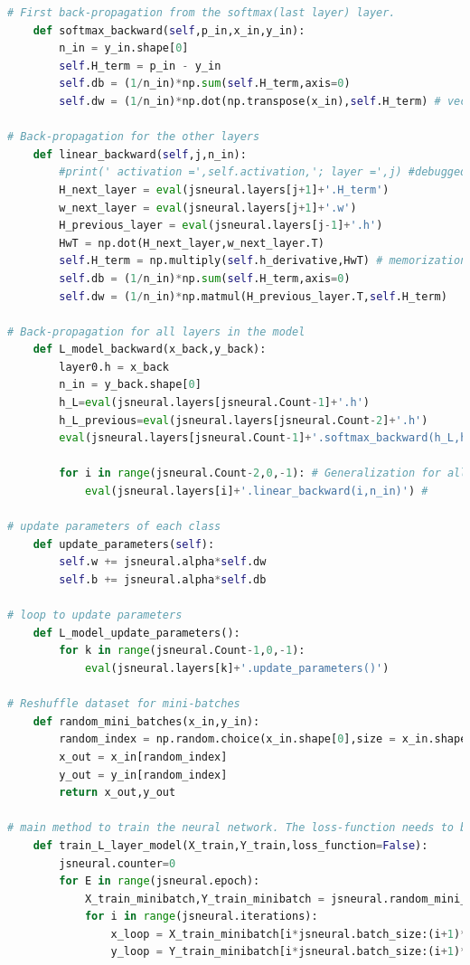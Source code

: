 \documentclass{article}
\begin{document}
\begin{lstlisting}[language=Python]
# First back-propagation from the softmax(last layer) layer.    
    def softmax_backward(self,p_in,x_in,y_in):
        n_in = y_in.shape[0]
        self.H_term = p_in - y_in
        self.db = (1/n_in)*np.sum(self.H_term,axis=0)
        self.dw = (1/n_in)*np.dot(np.transpose(x_in),self.H_term) # vector dJ/dW_j to update w_j for softmax

# Back-propagation for the other layers    
    def linear_backward(self,j,n_in):
        #print(' activation =',self.activation,'; layer =',j) #debugged - passed attributes
        H_next_layer = eval(jsneural.layers[j+1]+'.H_term')
        w_next_layer = eval(jsneural.layers[j+1]+'.w')
        H_previous_layer = eval(jsneural.layers[j-1]+'.h')
        HwT = np.dot(H_next_layer,w_next_layer.T)
        self.H_term = np.multiply(self.h_derivative,HwT) # memorization of commom term to backpropagate
        self.db = (1/n_in)*np.sum(self.H_term,axis=0)
        self.dw = (1/n_in)*np.matmul(H_previous_layer.T,self.H_term)

# Back-propagation for all layers in the model    
    def L_model_backward(x_back,y_back):     
        layer0.h = x_back
        n_in = y_back.shape[0]
        h_L=eval(jsneural.layers[jsneural.Count-1]+'.h')
        h_L_previous=eval(jsneural.layers[jsneural.Count-2]+'.h')
        eval(jsneural.layers[jsneural.Count-1]+'.softmax_backward(h_L,h_L_previous,y_back)')
        
        for i in range(jsneural.Count-2,0,-1): # Generalization for all layers - ok
            eval(jsneural.layers[i]+'.linear_backward(i,n_in)') #

# update parameters of each class    
    def update_parameters(self):
        self.w += jsneural.alpha*self.dw
        self.b += jsneural.alpha*self.db
        
# loop to update parameters 
    def L_model_update_parameters():
        for k in range(jsneural.Count-1,0,-1):
            eval(jsneural.layers[k]+'.update_parameters()')
            
# Reshuffle dataset for mini-batches
    def random_mini_batches(x_in,y_in):
        random_index = np.random.choice(x_in.shape[0],size = x_in.shape[0], replace= False)
        x_out = x_in[random_index]
        y_out = y_in[random_index]
        return x_out,y_out

# main method to train the neural network. The loss-function needs to be called.
    def train_L_layer_model(X_train,Y_train,loss_function=False):
        jsneural.counter=0
        for E in range(jsneural.epoch):
            X_train_minibatch,Y_train_minibatch = jsneural.random_mini_batches(X_train,Y_train)
            for i in range(jsneural.iterations):     
                x_loop = X_train_minibatch[i*jsneural.batch_size:(i+1)*jsneural.batch_size,:]
                y_loop = Y_train_minibatch[i*jsneural.batch_size:(i+1)*jsneural.batch_size,:]
                

\end{lstlisting}
\end{document}
